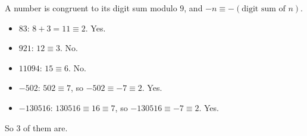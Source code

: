 A number is congruent to its digit sum modulo $9$, and $-n\equiv-(\text{digit sum of }n)$.
\begin{itemize}
\item $83$: $8+3=11\equiv2$. Yes.
\item $921$: $12\equiv3$. No.
\item $11094$: $15\equiv6$. No.
\item $-502$: $502\equiv7$, so $-502\equiv-7\equiv2$. Yes.
\item $-130516$: $130516\equiv16\equiv7$, so $-130516\equiv-7\equiv2$. Yes.
\end{itemize}
So $\boxed{3}$ of them are.
